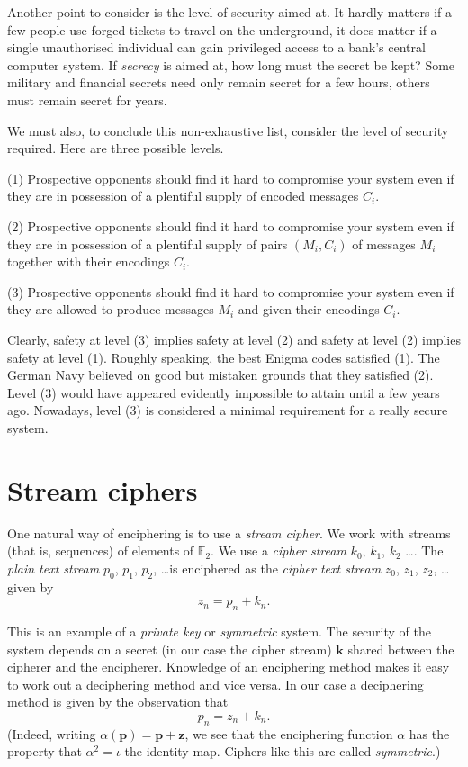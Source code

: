 Another point to consider is the level of
security aimed at. It hardly matters if
a few people use forged tickets to travel
on the underground, it does matter
if a single unauthorised individual can gain
privileged access to a bank's central computer
system. If \emph{secrecy} is aimed at, how long
must the secret be kept? Some military
and financial secrets need only remain secret
for a few hours, others must remain secret
for years.

We must also, to conclude this non-exhaustive
list, consider the level of security required.
Here are three possible levels.

(1) Prospective opponents should find
it hard to compromise your system even
if they are in possession of
a plentiful supply of encoded messages $C_{i}$.

(2) Prospective opponents should find
it hard to compromise your system even
if they are in possession of
a plentiful supply of pairs $(M_{i},C_{i})$
of messages $M_{i}$ together with their encodings $C_{i}$.

(3) Prospective opponents should find
it hard to compromise your system even
if they are allowed to produce messages $M_{i}$
and given their encodings $C_{i}$.

\noindent Clearly, safety
at level (3) implies safety at level (2)
and safety at level (2) implies safety
at level (1). Roughly speaking, the best Enigma codes
satisfied (1). The German Navy believed on good
but mistaken grounds that they satisfied (2).
Level (3) would have appeared evidently impossible
to attain until a few years ago.
Nowadays, level (3) is considered
a minimal requirement for a really secure system.

\section{Stream ciphers} One natural way of
enciphering is to use a \emph{stream cipher}.
We work with streams (that is, sequences) of
elements of ${\mathbb F}_{2}$.
We use a \emph{cipher stream} $k_{0}$, $k_{1}$,
$k_{2}$ \dots. The \emph{plain text stream}
$p_{0}$, $p_{1}$, $p_{2}$, \dots is enciphered
as the \emph{cipher text stream}
$z_{0}$, $z_{1}$, $z_{2}$, \dots  given by
\[z_{n}=p_{n}+k_{n}.\]

This is an example of a \emph{private key} or
\emph{symmetric} system. The security of
the system depends on a secret (in our
case the cipher stream) ${\mathbf k}$
shared between the cipherer and the encipherer.
Knowledge of an enciphering method makes it
easy to work out a deciphering method
and vice versa. In our case a deciphering method
is given by the observation that
\[p_{n}=z_{n}+k_{n}.\]
(Indeed, writing $\alpha(\mathbf{p})=\mathbf{p}+\mathbf{z}$,
we see that the enciphering function $\alpha$ has
the property that $\alpha^{2}=\iota$ the identity map.
Ciphers like this are called \emph{symmetric}.)

